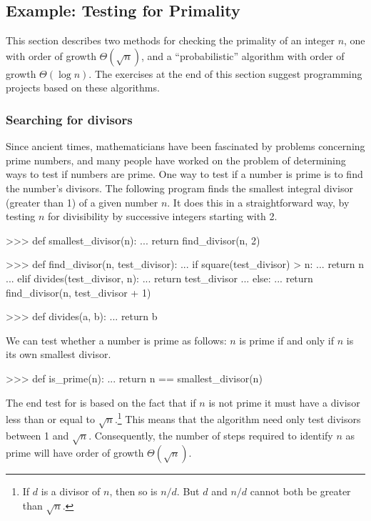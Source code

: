 \subsection{Example: Testing for Primality}
\label{Section 1.2.6}

This section describes two methods for checking the primality of an integer
\( n \), one with order of growth \( \Theta(\sqrt{n}) \), and a
``probabilistic'' algorithm with order of growth \( \Theta(\log n) \).
The exercises at the end of this section suggest programming projects based on
these algorithms.

\subsubsection*{Searching for divisors}

Since ancient times, mathematicians have been fascinated by problems concerning
prime numbers, and many people have worked on the problem of determining ways
to test if numbers are prime.  One way to test if a number is prime is to find
the number's divisors.  The following program finds the smallest integral
divisor (greater than 1) of a given number \( n \).  It does this in a
straightforward way, by testing \( n \) for divisibility by successive integers
starting with 2.

\begin{codeBlock}
>>> def smallest_divisor(n):
...     return find_divisor(n, 2)

>>> def find_divisor(n, test_divisor):
...     if square(test_divisor) > n:
...         return n
...     elif divides(test_divisor, n):
...         return test_divisor
...     else:
...         return find_divisor(n, test_divisor + 1)

>>> def divides(a, b):
...     return b %
\end{codeBlock}

\noindent
We can test whether a number is prime as follows: \( n \) is prime if and only if
\( n \) is its own smallest divisor.

\begin{codeBlock}
>>> def is_prime(n):
...     return n == smallest_divisor(n)
\end{codeBlock}

\noindent
The end test for  is based on the fact that if \( n \) is
not prime it must have a divisor less than or equal to
\( \sqrt{n} \).\footnote{If \( d \) is a divisor of \( n \), then so is
\( n / d \).  But \( d \) and \( n / d \) cannot both be greater than
\( \sqrt{n} \).}  This means that the algorithm need only test divisors
between 1 and \( \sqrt{n} \).  Consequently, the number of steps required
to identify \( n \) as prime will have order of growth
\( \Theta(\sqrt{n}) \).

